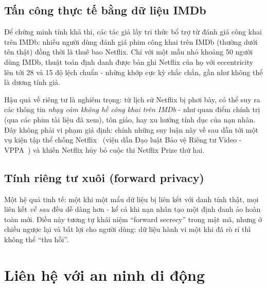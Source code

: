 \subsection{Tấn công thực tế bằng dữ liệu IMDb}
Để chứng minh tính khả thi, các tác giả lấy tri thức bổ trợ từ đánh giá công khai trên IMDb: nhiều người dùng đánh giá phim công khai trên IMDb (thường dưới tên thật) đồng thời là thuê bao Netflix. Chỉ với một mẫu nhỏ khoảng 50 người dùng IMDb, thuật toán định danh được bản ghi Netflix của họ với eccentricity lên tới 28 và 15 độ lệch chuẩn - những khớp cực kỳ chắc chắn, gần như không thể là dương tính giả.

Hậu quả về riêng tư là nghiêm trọng: từ lịch sử Netflix bị phơi bày, có thể suy ra các thông tin \textit{nhạy cảm không hề công khai trên IMDb} - như quan điểm chính trị (qua các phim tài liệu đã xem), tôn giáo, hay xu hướng tính dục của nạn nhân. Đây không phải vi phạm giả định: chính những suy luận này về sau dẫn tới một vụ kiện tập thể chống Netflix~\cite{netflixsuit} (viện dẫn Đạo luật Bảo vệ Riêng tư Video - VPPA~\cite{vppa}) và khiến Netflix hủy bỏ cuộc thi Netflix Prize thứ hai.

\subsection{Tính riêng tư xuôi (forward privacy)}
Một hệ quả tinh tế: một khi một mẩu dữ liệu bị liên kết với danh tính thật, mọi liên kết \textit{về sau} đều dễ dàng hơn - kể cả khi nạn nhân tạo một định danh ảo hoàn toàn mới. Điều này tương tự khái niệm ``forward secrecy'' trong mật mã, nhưng ở chiều ngược lại và bất lợi cho người dùng: dữ liệu hành vi một khi đã rò rỉ thì không thể ``thu hồi''.

\section{Liên hệ với an ninh di động}

